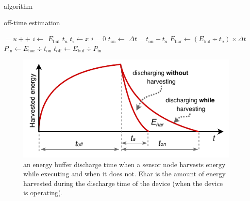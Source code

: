 \documentclass{article}
\begin{document}
\begin{algorithm}[t]
	\caption{algorithm}{off-time estimation}
    \label{algo:offTime}
    \small
    \begin{algorithmic}[1]
		\State {} $= u{+}{+}$ 
			\State $i \leftarrow $   \label{lin:i}
		\State $E_\text{buf}$ 
			\State $t_a$ \label{lin:ta}
		\State$ t_{i} \leftarrow x $ 
		    \State $i=0$
			\State {}  \label{lin:fixedLoad}
			\State \label{lin:ontime} $t_\text{on} \leftarrow$  \label{lin:ton}
		\EndIf
			\State \label{lin:deltat}$\Delta{t} = t_\text{on}-t_a$   \label{lin:td}
			\State \label{lin:ehar}$E_\text{har} \leftarrow (E_\text{buf}\div t_a)\times\Delta{t}$ 
			\State $P_\text{in} \leftarrow E_\text{har}\div{t_\text{on}}$  \label{lin:pin}
			\State \label{lin:offtime}$t_\text{off} \leftarrow E_\text{buf}\div P_\text{in}$ 
		\EndIf
	\end{algorithmic}
\end{algorithm}

\begin{figure}
		\centering
		\includegraphics[]{figures/softwareClock}
		\caption{an energy buffer discharge time when a sensor node harvests energy while executing and when it does not. Ehar is the amount of energy harvested during the discharge time of the device (when the device is operating).}
		\label{fig:softwareClock}

\end{figure}
\end{document}
